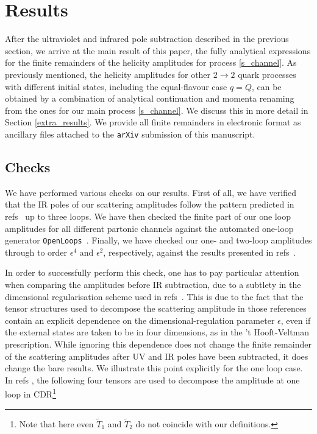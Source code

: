 
\section{Results} \label{results}

After the ultraviolet and infrared pole subtraction described in the previous section, we arrive at the main result of this paper, the fully analytical expressions for the finite remainders of the helicity amplitudes for process \eqref{s_channel}.
As previously mentioned,  the helicity amplitudes for other $2\to2$ quark processes with different initial states, including the equal-flavour case $q=Q$, can be obtained by a combination of analytical continuation and momenta renaming from the ones for our main process \eqref{s_channel}.  We  discuss this in more detail in Section \ref{extra_results}.
We provide all finite remainders  in electronic format as ancillary files attached
to the \texttt{arXiv} submission of this manuscript.

\subsection{Checks}
We have performed various checks on our results. First of all, we have verified that the IR poles of our scattering
amplitudes  follow the pattern predicted in refs~\cite{Becher:2009qa,Becher:2009cu,Almelid:2015jia} up to three loops.
We have then checked the finite part of our one loop amplitudes for all different partonic channels against the automated one-loop generator \texttt{OpenLoops}~\cite{Cascioli:2011va,Buccioni:2019sur}.
Finally, we have checked our one- and two-loop amplitudes through to order $\epsilon^4$ and $\epsilon^2$, respectively,
 against the results presented in refs~\cite{Glover:2004si,Ahmed:2019qtg}.

In order to successfully perform this check, one has to pay particular attention when comparing the amplitudes before IR subtraction, 
due to a subtlety in the  dimensional regularisation scheme 
used in refs~\cite{Glover:2004si,Ahmed:2019qtg}. This is due to the fact that the tensor structures
used to decompose the scattering amplitude in those references contain an explicit dependence on the dimensional-regulation
parameter $\epsilon$, even if the external states are taken to be in four dimensions, as in the 't Hooft-Veltman prescription.
While ignoring this dependence does not change the finite remainder of the scattering amplitudes after UV and IR poles have been subtracted,
it does change the bare results.
We illustrate this point explicitly for the one loop case. 
In refs \cite{Glover:2004si,Ahmed:2019qtg},  the following four tensors are used to decompose the amplitude at one loop
in CDR\footnote{Note that here even $\widetilde T_1$  and  $\widetilde T_2$ do not coincide with our definitions.}

